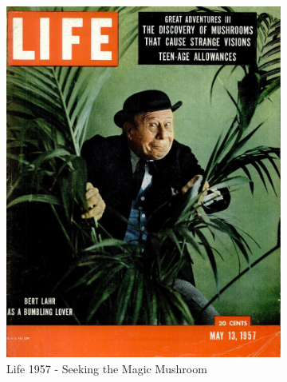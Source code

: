 \documentclass{UIdahoMastersThesis}
\begin{document}
\begin{figure}[h!]
  \centering
  \begin{subfigure}[b]{0.4\linewidth}
    \includegraphics[width=\linewidth]{life57.png}
    \caption{Life 1957 - Seeking the Magic Mushroom}
  \end{subfigure}
  \begin{subfigure}[b]{0.4\linewidth}

\end{subfigure}
\end{figure}
\end{document}
